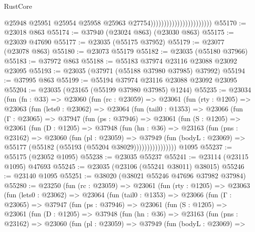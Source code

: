 \begin{lexlean}{RustCore}
\begin{coremodule}
                                                  @25948
                                                  @25951
                                                  @25954
                                                  @25958
                                                  @25963
                                                  @27754)))))))))))))))))))))))
@55170 := @23018 @863
@55174 := @37940 (@23024 @863) (@23030 @863)
@55175 := @23039 @47690
@55177 := @23035 (@55175 @37952)
@55179 := @23077 (@23078 @863)
@55180 := @23073 @55179
@55182 := @23035 (@55180 @37966)
@55183 := @37972 @863
@55188 := @55183 @37974 @23116 @23088 @23092 @23095
@55193 := @23035 (@37971 (@55188 @37980 @37985) @37992)
@55194 := @37995 @863
@55199 := @55194 @37974 @23116 @23088 @23092 @23095
@55204 := @23035 (@23165 (@55199 @37980 @37985) @1244)
@55235 := @23034
    (fun (fn : @33) =>
    @23060
      (fun (rc : @23059) =>
      @23061
        (fun (rty : @1205) =>
        @23063
          (fun (lets0 : @23062) =>
          @23064
            (fun (tail0 : @1353) =>
            @23066
              (fun (Γ : @23065) =>
              @37947
                (fun (ps : @37946) =>
                @23061
                  (fun (S : @1205) =>
                  @23061
                    (fun (D : @1205) =>
                    @37948
                      (fun (hn : @36) =>
                      @23163
                        (fun (pns : @23162) =>
                        @23060
                          (fun (pl : @23059) =>
                          @37949
                            (fun (bodyL : @23069) =>
                            @55177 (@55182 (@55193 (@55204 @38029))))))))))))))))
    @1095
@55237 := @55175 (@23052 @1095)
@55238 := @23035 @55237
@55241 := @23114 (@23115 @1095) @47693
@55245 := @23035 (@23106 (@55241 @38011) @38015)
@55246 := @23140 @1095
@55251 := @38020 (@38021 @55246 @47696 @37982 @37984)
@55280 := @23250
    (fun (rc : @23059) =>
    @23061
      (fun (rty : @1205) =>
      @23063
        (fun (lets0 : @23062) =>
        @23064
          (fun (tail0 : @1353) =>
          @23066
            (fun (Γ : @23065) =>
            @37947
              (fun (ps : @37946) =>
              @23061
                (fun (S : @1205) =>
                @23061
                  (fun (D : @1205) =>
                  @37948
                    (fun (hn : @36) =>
                    @23163
                      (fun (pns : @23162) =>
                      @23060
                        (fun (pl : @23059) =>
                        @37949
                          (fun (bodyL : @23069) =>

\end{coremodule}
\end{lexlean}
